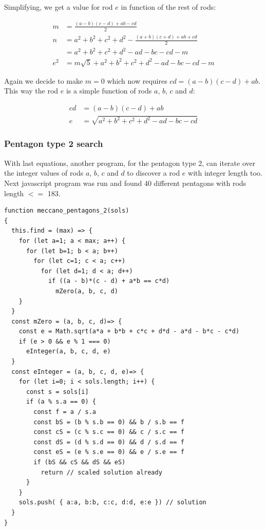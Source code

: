 \documentclass[11pt]{article}
\begin{document}
Simplifying, we get a value for rod $e$ in function of the rest of rods:

\begin{align*}
m   &= \frac{(a - b)(c - d) + ab - cd}{2} \\
n   &= a^2 + b^2 + c^2 + d^2 - \frac{(a + b)(c + d) + ab + cd}{2} \\
    &=  a^2 + b^2 + c^2 + d^2 - ad - bc - cd - m \\
e^2 &= m\sqrt{5} + a^2 + b^2 + c^2 + d^2 - ad - bc - cd - m
\end{align*}

Again we decide to make $m = 0$ which now requires $cd = (a-b)(c-d)+ab$.
This way the rod $e$ is a simple function of rods $a$, $b$, $c$ and $d$:

\begin{align*}
cd &= (a - b)(c - d ) + ab \\
e &= \sqrt{a^2 + b^2 + c^2 + d^2 - ad - bc - cd}
\end{align*}

\subsubsection{Pentagon type 2 search}

With last equations, another program, for the pentagon type 2, can iterate over the integer values of rods $a$, $b$, $c$ and $d$ to discover a rod $e$ with integer length too. Next javascript program was run and found 40 different pentagons with rods length $<=$ 183.

\begin{lstlisting}
function meccano_pentagons_2(sols)
{
  this.find = (max) => {
    for (let a=1; a < max; a++) {
      for (let b=1; b < a; b++)
        for (let c=1; c < a; c++)
          for (let d=1; d < a; d++)
            if ((a - b)*(c - d) + a*b == c*d)
              mZero(a, b, c, d)
    }
  }
  const mZero = (a, b, c, d)=> {
    const e = Math.sqrt(a*a + b*b + c*c + d*d - a*d - b*c - c*d)
    if (e > 0 && e % 1 === 0)
      eInteger(a, b, c, d, e)
  }
  const eInteger = (a, b, c, d, e)=> {
    for (let i=0; i < sols.length; i++) {
      const s = sols[i]
      if (a % s.a == 0) {
        const f = a / s.a
        const bS = (b % s.b == 0) && b / s.b == f
        const cS = (c % s.c == 0) && c / s.c == f
        const dS = (d % s.d == 0) && d / s.d == f
        const eS = (e % s.e == 0) && e / s.e == f
        if (bS && cS && dS && eS)
          return // scaled solution already
      }
    }
    sols.push( { a:a, b:b, c:c, d:d, e:e }) // solution
  }
}

\end{lstlisting}
\end{document}
